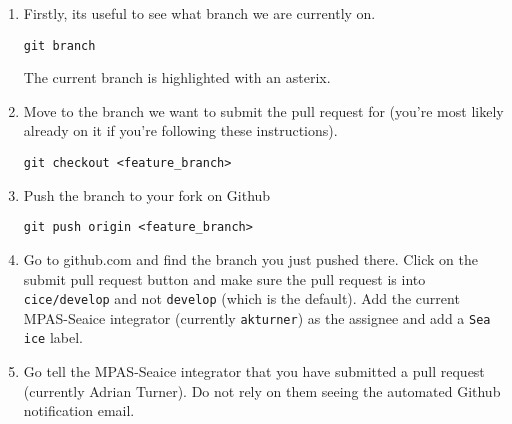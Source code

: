 \documentclass{article}
\begin{document}
\begin{enumerate}

\item Firstly, its useful to see what branch we are currently on.

\verb+git branch+

The current branch is highlighted with an asterix.

\item Move to the branch we want to submit the pull request for (you're most likely already on it if you're following these instructions).

\verb+git checkout <feature_branch>+

\item Push the branch to your fork on Github

\verb+git push origin <feature_branch>+

\item Go to github.com and find the branch you just pushed there. Click on the submit pull request button and make sure the pull request is into \verb+cice/develop+ and not \verb+develop+ (which is the default). Add the current MPAS-Seaice integrator (currently \verb+akturner+) as the assignee and add a \verb+Sea ice+ label.

\item Go tell the MPAS-Seaice integrator that you have submitted a pull request (currently Adrian Turner). Do not rely on them seeing the automated Github notification email.

\end{enumerate}



\end{document}
